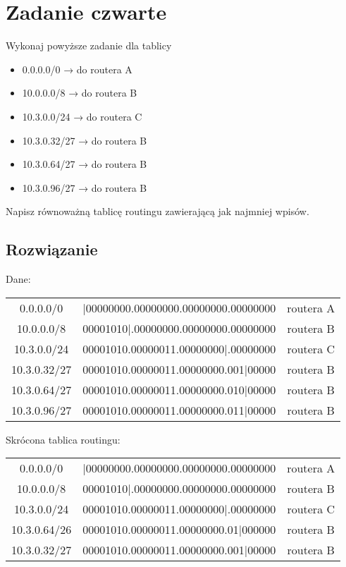 \documentclass[a4paper]{article}
\begin{document}

\section{Zadanie czwarte}
Wykonaj powyższe zadanie dla tablicy
\begin{itemize}
\item 0.0.0.0/0 → do routera A
\item 10.0.0.0/8 → do routera B
\item 10.3.0.0/24 → do routera C
\item 10.3.0.32/27 → do routera B
\item 10.3.0.64/27 → do routera B
\item 10.3.0.96/27 → do routera B
\end{itemize}
Napisz równoważną tablicę routingu zawierającą jak najmniej wpisów.


\subsection{Rozwiązanie}
Dane:
\begin{center}
\begin{tabular}{ |c|c|c| } 
 \hline
 0.0.0.0/0 & |00000000.00000000.00000000.00000000 & routera A \\ 
 10.0.0.0/8 & 00001010|.00000000.00000000.00000000 & routera B \\ 
10.3.0.0/24 & 00001010.00000011.00000000|.00000000 & routera C \\
10.3.0.32/27 & 00001010.00000011.00000000.001|00000 & routera B\\
10.3.0.64/27 & 00001010.00000011.00000000.010|00000 & routera B\\
10.3.0.96/27 & 00001010.00000011.00000000.011|00000 & routera B\\
 \hline
\end{tabular}
\end{center}
Skrócona tablica routingu:
\begin{center}
\begin{tabular}{ |c|c|c| } 
 \hline
 0.0.0.0/0 & |00000000.00000000.00000000.00000000 & routera A \\ 
 10.0.0.0/8 & 00001010|.00000000.00000000.00000000 & routera B \\ 
10.3.0.0/24 & 00001010.00000011.00000000|.00000000 & routera C \\
10.3.0.64/26 & 00001010.00000011.00000000.01|000000 & routera B\\
10.3.0.32/27 & 00001010.00000011.00000000.001|00000 & routera B\\
 \hline
\end{tabular}
\end{center}
\end{document}
